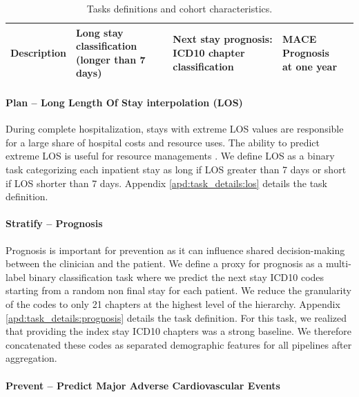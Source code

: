 \documentclass[french,12pt,twoside,a4paper]{book}
\begin{document}
\begin{table}[!ht]
{\begin{tabular}{|l|l|l|l|}
      \textbf{Description}        & \makecell[l]{Long stay classification                                                       \\ (longer than 7 days)} & \makecell[l]{Next stay prognosis:\\ICD10 chapter classification} & \makecell[l]{MACE Prognosis\\at one year}                                      \\ \hline
    \end{tabular}
  }
  \vspace{1em}%
  \caption{Tasks definitions and cohort characteristics.}%
  \label{table:predictive_tasks_summary}%
\end{table}

\paragraph{Plan -- Long Length Of Stay interpolation
  (LOS)}\label{par:task_definitions:los}%
During complete hospitalization, stays with extreme LOS values are responsible
for a large share of hospital costs and resource uses. The ability to predict
extreme LOS is useful for resource managements
\citep{omachonu2004predicting,caetano2014data,jiang2023health}.
We define LOS as a binary task categorizing each inpatient stay as long if LOS
greater than 7 days or short if LOS shorter than 7 days. Appendix
\ref{apd:task_details:los} details the task definition.

\paragraph{Stratify -- Prognosis}\label{par:task_definitions:prognosis}%
Prognosis is important for prevention as it can influence shared decision-making
between the clinician and the patient.
We define a proxy for prognosis as a multi-label binary classification task
where we predict the next stay ICD10 codes starting from a random non final stay
for each patient. We reduce the granularity of the codes to only 21 chapters
at the highest level of the hierarchy. Appendix \ref{apd:task_details:prognosis}
details the task definition. For this task, we realized that providing the index
stay ICD10 chapters was a strong baseline. We
therefore concatenated these codes as separated demographic features for all
pipelines after aggregation.

\paragraph{Prevent -- Predict Major Adverse Cardiovascular Events}\label{par:task_definitions:mace}
\end{document}
